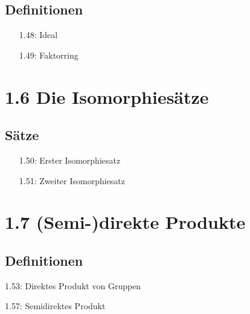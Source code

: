 \documentclass[twocolumn]{report}
\begin{document}
\subsection*{Definitionen}
\begin{itemize}[itemsep=0pt, topsep=0pt, parsep=0pt, partopsep=0pt, leftmargin=*]
    \item[1.48:] Ideal
    \item[1.49:] Faktorring
\end{itemize}

\section*{1.6 Die Isomorphiesätze}
\subsection*{Sätze}
\begin{itemize}[itemsep=0pt, topsep=0pt, parsep=0pt, partopsep=0pt, leftmargin=*]
    \item[1.50:] Erster Isomorphiesatz
    \item[1.51:] Zweiter Isomorphiesatz
\end{itemize}

\section*{1.7 (Semi-)direkte Produkte}
\subsection*{Definitionen}
\begin{enumerate*}[itemsep=0pt, topsep=0pt, parsep=0pt, partopsep=0pt, leftmargin=*]
    \item[1.53:] Direktes Produkt von Gruppen
    \item[1.57:] Semidirektes Produkt
\end{enumerate*}
\end{document}
